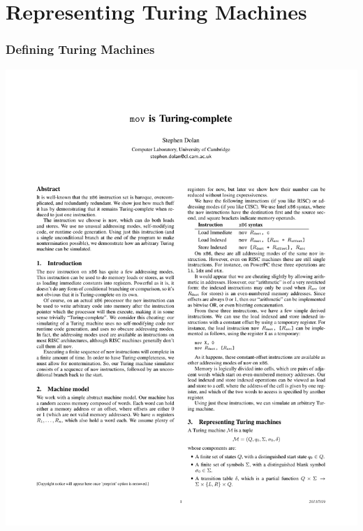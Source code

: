 \documentclass{beamer}
\begin{document}
\section{Representing Turing Machines}

\begin{frame}[fragile]
\frametitle{Defining Turing Machines}

\begin{center}
\includegraphics[scale=1.1]{figures/TuringMachine}
\end{center}
\end{frame}
\end{document}

